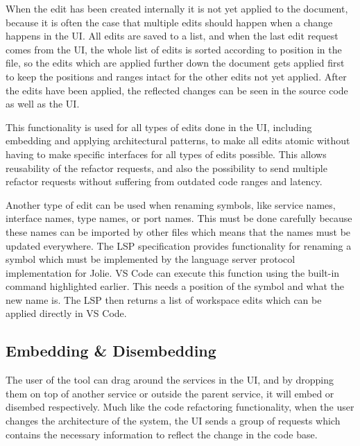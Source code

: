 When the edit has been created internally it is not yet applied to the document, because it is often the case that multiple edits should happen when a change happens in the UI.
All edits are saved to a list, and when the last edit request comes from the UI, the whole list of edits is sorted according to position in the file, so the edits which are applied further down the document gets applied first to keep the positions and ranges intact for the other edits not yet applied.
After the edits have been applied, the reflected changes can be seen in the source code as well as the UI.

This functionality is used for all types of edits done in the UI, including embedding and applying architectural patterns, to make all edits atomic without having to make specific interfaces for all types of edits possible. 
This allows reusability of the refactor requests, and also the possibility to send multiple refactor requests without suffering from outdated code ranges and latency.

Another type of edit can be used when renaming symbols, like service names, interface names, type names, or port names. This must be done carefully because these names can be imported by other files which means that the names must be updated everywhere.
The LSP specification provides functionality for renaming a symbol which must be implemented by the language server protocol implementation for Jolie.
VS Code can execute this function using the built-in command highlighted earlier. This needs a position of the symbol and what the new name is. The LSP then returns a list of workspace edits which can be applied directly in VS Code.

\subsection{Embedding \& Disembedding}
The user of the tool can drag around the services in the UI, and by dropping them on top of another service or outside the parent service, it will embed or disembed respectively.
Much like the code refactoring functionality, when the user changes the architecture of the system, the UI sends a group of requests which contains the necessary information to reflect the change in the code base.



